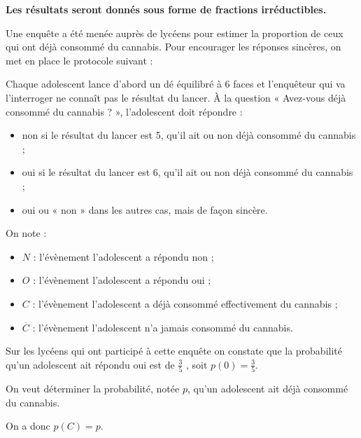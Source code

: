 \medskip

\textbf{Les résultats seront donnés sous forme de fractions irréductibles.}

Une enquête a été menée auprès de lycéens pour estimer la proportion de ceux qui ont déjà consommé du cannabis. Pour encourager les réponses sincères, on met en place le protocole suivant :

Chaque adolescent lance d’abord un dé équilibré à 6 faces et l’enquêteur qui va l’interroger ne connaît pas le résultat du lancer. À la question « Avez-vous déjà consommé du cannabis ? », l’adolescent doit répondre :

\begin{itemize}
\item [\textbullet] \og non \fg{} si le résultat du lancer est 5, qu’il ait ou non déjà consommé du cannabis ;
\item [\textbullet] \og oui \fg{} si le résultat du lancer est 6, qu’il ait ou non déjà consommé du cannabis ;
\item [\textbullet] \og oui \fg{} ou « non » dans les autres cas, mais de façon sincère.
\end{itemize}

On note :

\begin{itemize}
\item [\textbullet] $N$ : l’évènement l’adolescent a répondu \og non \fg{} ;
\item [\textbullet] $O$ : l’évènement l’adolescent a répondu \og oui \fg{} ;
\item [\textbullet] $C$ : l’évènement l’adolescent a déjà consommé effectivement du cannabis ;
\item [\textbullet] $\overline{C}$ : l’évènement l’adolescent n'a jamais consommé du cannabis.
\end{itemize} 

Sur les lycéens qui ont participé à cette enquête on constate que la probabilité qu’un adolescent ait répondu \og oui \fg{} est de $\frac{3}{5}$ , soit $p(0) = \frac{3}{5}$.

On veut déterminer la probabilité, notée $p$, qu’un adolescent ait déjà consommé du cannabis.

On a donc $p(C)= p$.

\medskip

